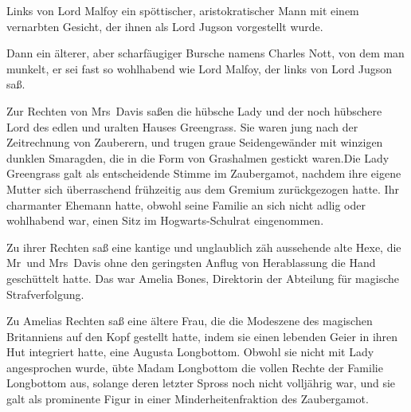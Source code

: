 Links von Lord Malfoy ein spöttischer, aristokratischer Mann mit einem vernarbten Gesicht, der ihnen als Lord Jugson vorgestellt wurde.

Dann ein älterer, aber scharfäugiger Bursche namens Charles Nott, von dem man munkelt, er sei fast so wohlhabend wie Lord Malfoy, der links von Lord Jugson saß.

Zur Rechten von Mrs~Davis saßen die hübsche Lady und der noch hübschere Lord des edlen und uralten Hauses Greengrass. Sie waren jung nach der Zeitrechnung von Zauberern, und trugen graue Seidengewänder mit winzigen dunklen Smaragden, die in die Form von Grashalmen gestickt waren.Die Lady Greengrass galt als entscheidende Stimme im Zaubergamot, nachdem ihre eigene Mutter sich überraschend frühzeitig aus dem Gremium zurückgezogen hatte. Ihr charmanter Ehemann hatte, obwohl seine Familie an sich nicht adlig oder wohlhabend war, einen Sitz im Hogwarts-Schulrat eingenommen.

Zu ihrer Rechten saß eine kantige und unglaublich zäh aussehende alte Hexe, die Mr~und Mrs~Davis ohne den geringsten Anflug von Herablassung die Hand geschüttelt hatte. Das war Amelia Bones, Direktorin der Abteilung für magische Strafverfolgung.

Zu Amelias Rechten saß eine ältere Frau, die die Modeszene des magischen Britanniens auf den Kopf gestellt hatte, indem sie einen lebenden Geier in ihren Hut integriert hatte, eine Augusta Longbottom. Obwohl sie nicht mit Lady angesprochen wurde, übte Madam Longbottom die vollen Rechte der Familie Longbottom aus, solange deren letzter Spross noch nicht volljährig war, und sie galt als prominente Figur in einer Minderheitenfraktion des Zaubergamot.

